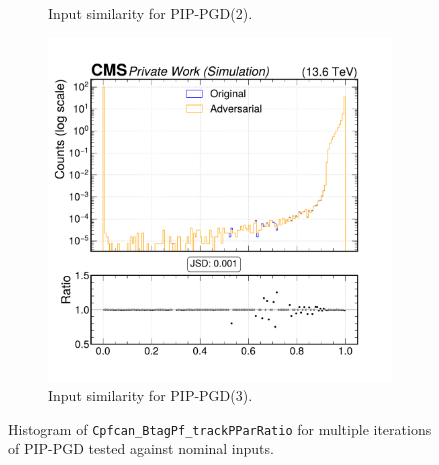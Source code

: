 \begin{figure}[htbp]
\begin{subfigure}[t]{0.32\textwidth}
    \caption*{Input similarity for PIP-PGD(2).}
  \end{subfigure}\hfill
  \begin{subfigure}[t]{0.32\textwidth}
    \includegraphics[width=\linewidth]{media/output/features/compare/combined_it_3/cmp_cpf_arr_Cpfcan_BtagPf_trackPParRatio.pdf}
    \caption*{Input similarity for PIP-PGD(3).}
  \end{subfigure}

  \caption*{Histogram of \texttt{Cpfcan\_BtagPf\_trackPParRatio} for multiple iterations of PIP-PGD tested against nominal inputs.}
  \label{fig:combined_input_Cpfcan_BtagPf_trackPParRatio}
\end{figure}

